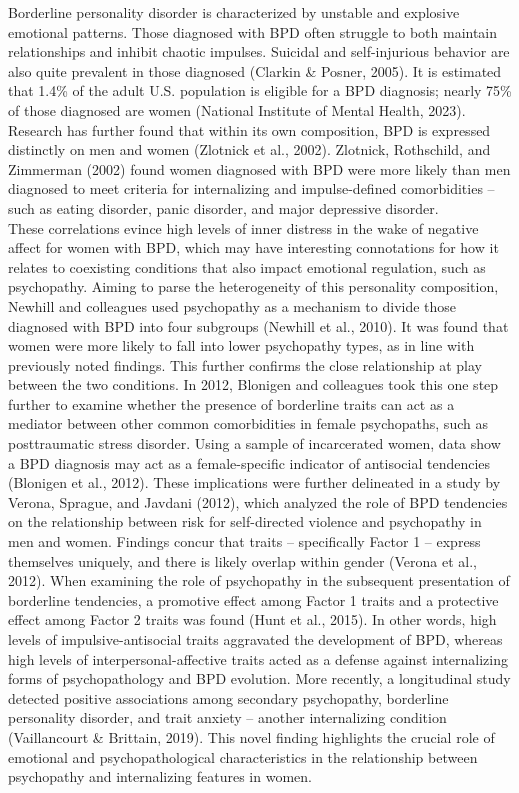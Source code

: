 \documentclass[
  man,floatsintext]{apa7}
\begin{document}
Borderline personality disorder is characterized by unstable and explosive emotional patterns. Those diagnosed with BPD often struggle to both maintain relationships and inhibit chaotic impulses. Suicidal and self-injurious behavior are also quite prevalent in those diagnosed (Clarkin \& Posner, 2005). It is estimated that 1.4\% of the adult U.S. population is eligible for a BPD diagnosis; nearly 75\% of those diagnosed are women (National Institute of Mental Health, 2023). Research has further found that within its own composition, BPD is expressed distinctly on men and women (Zlotnick et al., 2002). Zlotnick, Rothschild, and Zimmerman (2002) found women diagnosed with BPD were more likely than men diagnosed to meet criteria for internalizing and impulse-defined comorbidities -- such as eating disorder, panic disorder, and major depressive disorder.\\
These correlations evince high levels of inner distress in the wake of negative affect for women with BPD, which may have interesting connotations for how it relates to coexisting conditions that also impact emotional regulation, such as psychopathy. Aiming to parse the heterogeneity of this personality composition, Newhill and colleagues used psychopathy as a mechanism to divide those diagnosed with BPD into four subgroups (Newhill et al., 2010). It was found that women were more likely to fall into lower psychopathy types, as in line with previously noted findings. This further confirms the close relationship at play between the two conditions. In 2012, Blonigen and colleagues took this one step further to examine whether the presence of borderline traits can act as a mediator between other common comorbidities in female psychopaths, such as posttraumatic stress disorder. Using a sample of incarcerated women, data show a BPD diagnosis may act as a female-specific indicator of antisocial tendencies (Blonigen et al., 2012). These implications were further delineated in a study by Verona, Sprague, and Javdani (2012), which analyzed the role of BPD tendencies on the relationship between risk for self-directed violence and psychopathy in men and women. Findings concur that traits -- specifically Factor 1 -- express themselves uniquely, and there is likely overlap within gender (Verona et al., 2012). When examining the role of psychopathy in the subsequent presentation of borderline tendencies, a promotive effect among Factor 1 traits and a protective effect among Factor 2 traits was found (Hunt et al., 2015). In other words, high levels of impulsive-antisocial traits aggravated the development of BPD, whereas high levels of interpersonal-affective traits acted as a defense against internalizing forms of psychopathology and BPD evolution. More recently, a longitudinal study detected positive associations among secondary psychopathy, borderline personality disorder, and trait anxiety -- another internalizing condition (Vaillancourt \& Brittain, 2019). This novel finding highlights the crucial role of emotional and psychopathological characteristics in the relationship between psychopathy and internalizing features in women.
\end{document}
